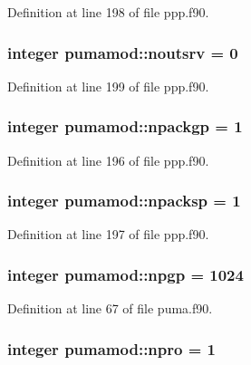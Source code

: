 \-Definition at line 198 of file ppp.\-f90.

\hypertarget{classpumamod_a44281642d8b5de10c4c6309d65787612}{
\subsubsection[{noutsrv}]{\setlength{\rightskip}{0pt plus 5cm}integer {\bf pumamod\-::noutsrv} = 0}}
\label{classpumamod_a44281642d8b5de10c4c6309d65787612}


\-Definition at line 199 of file ppp.\-f90.

\hypertarget{classpumamod_a9cd1e899ff739d1fde6cb241167a0b14}{
\subsubsection[{npackgp}]{\setlength{\rightskip}{0pt plus 5cm}integer {\bf pumamod\-::npackgp} = 1}}
\label{classpumamod_a9cd1e899ff739d1fde6cb241167a0b14}


\-Definition at line 196 of file ppp.\-f90.

\hypertarget{classpumamod_a3df9e3f62930046dd998328d83f90782}{
\subsubsection[{npacksp}]{\setlength{\rightskip}{0pt plus 5cm}integer {\bf pumamod\-::npacksp} = 1}}
\label{classpumamod_a3df9e3f62930046dd998328d83f90782}


\-Definition at line 197 of file ppp.\-f90.

\hypertarget{classpumamod_ac20b6aa2c443341280ab5e4ddc9bebd7}{
\subsubsection[{npgp}]{\setlength{\rightskip}{0pt plus 5cm}integer {\bf pumamod\-::npgp} = 1024}}
\label{classpumamod_ac20b6aa2c443341280ab5e4ddc9bebd7}


\-Definition at line 67 of file puma.\-f90.

\hypertarget{classpumamod_ae915be5ffac65dd8af555f2d75153398}{
\subsubsection[{npro}]{\setlength{\rightskip}{0pt plus 5cm}integer {\bf pumamod\-::npro} = 1}}
\label{classpumamod_ae915be5ffac65dd8af555f2d75153398}


